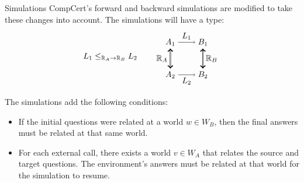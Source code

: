\documentclass{beamer}
\begin{document}
\begin{frame}{Simulations} %
CompCert's forward and backward simulations are modified to
take these changes into account.
The simulations will have a type:
\[
  L_1 \le_{\mathbb{R}_A \rightarrow \mathbb{R}_B} L_2 \qquad
  \begin{tikzpicture}[baseline,scale=0.7]
    \node (A1) at (-1,  1) {$A_1$};
    \node (A2) at (-1, -1) {$A_2$};
    \node (B1) at ( 1,  1) {$B_1$};
    \node (B2) at ( 1, -1) {$B_2$};
    \draw (A1) edge[->] node[auto] {$L_1$} (B1);
    \draw (A2) edge[->] node[auto,swap] {$L_2$} (B2);
    \draw (A1) edge[<->, double] node[auto,swap] {$\mathbb{R}_A$} (A2);
    \draw (B1) edge[<->, double] node[auto] {$\mathbb{R}_B$} (B2);
  \end{tikzpicture}
\]

The simulations add the following conditions:
\begin{itemize}
\item If the initial questions were related at a world $w \in W_B$,
  then the final answers must be related at that same world.
\item For each external call,
  there exists a world $v \in W_A$ that relates
  the source and target questions.
  The environment's answers must be related at that world
  for the simulation to resume.
\end{itemize}
\end{frame}
\end{document}
